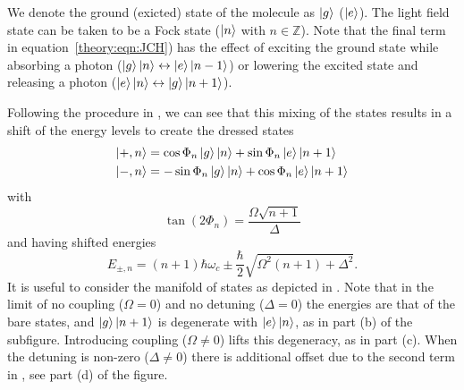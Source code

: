 \begin{figure}
  \caption{}
  \label{theory:fig:JCHstates}
\end{figure}

We denote the ground (exicted) state of the molecule as $\ket{g}$ ($\ket{e}$).
The light field state can be taken to be a Fock state ($\ket{n}$ with $n \in
\mathbb{Z}$). Note that the final term in equation~\ref{theory:eqn:JCH}) has
the effect of exciting the ground state while absorbing a photon
($\ket{g}\ket{n} \leftrightarrow \ket{e}\ket{n-1}$) or lowering the excited state
and releasing a photon ($\ket{e}\ket{n} \leftrightarrow \ket{g}\ket{n+1}$).

Following the procedure in , we can see that this
mixing of the states results in a shift of the energy levels to create the
dressed states
%
\begin{align}
  \ket{+, n} &= \cos\Phi_n \ket{g}\ket{n} + \sin\Phi_n \ket{e}\ket{n+1} \\
  \ket{-, n} &= -\sin\Phi_n \ket{g}\ket{n} + \cos\Phi_n \ket{e}\ket{n+1}
\end{align}
%
with
%
\begin{equation}
  \tan(2\Phi_n) = \frac{\Omega\sqrt{n+1}}{\Delta}
\end{equation}
%
and having shifted energies
%
\begin{equation}
  E_{\pm, n} = (n+1)\hbar\omega_c \pm \frac{\hbar}{2}\sqrt{\Omega^2(n+1) +
  \Delta^2}.
  \label{theory:eqn:JCHenergies}
\end{equation}
%
It is useful to consider the manifold of states as depicted in
.  
Note that in the limit of no coupling
($\Omega = 0$) and no detuning ($\Delta = 0$) the energies are that of the bare
states, and $\ket{g}\ket{n+1}$ is degenerate with $\ket{e}\ket{n}$, as in part
(b) of the subfigure. Introducing coupling ($\Omega \neq 0$) lifts this
degeneracy, as in part (c). When the detuning is non-zero ($\Delta \neq 0$)
there is additional offset due to the second term in
, see part (d) of the figure.

